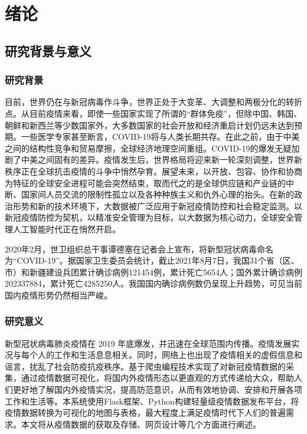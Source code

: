 \chapter{绪论}

\section{研究背景与意义}

\subsection{研究背景}

目前，世界仍在与新冠病毒作斗争，世界正处于大变革、大调整和两极分化的转折点。从目前疫情来看，即使一些国家实现了所谓的“群体免疫”，但除中国、韩国、朝鲜和新西兰等少数国家外，大多数国家的社会开放和经济重启计划仍远未达到预期。一些医学专家甚至断言，COVID-19将与人类长期共存。在此之前，由于中美之间的结构性竞争和贸易摩擦，全球经济地理空间重组。COVID-19的爆发无疑加剧了中美之间固有的差异。疫情发生后，世界格局将迎来新一轮深刻调整，世界新秩序正在全球抗击疫情的斗争中悄然孕育。展望未来，以开放、包容、协作和协商为特征的全球安全进程可能会突然结束，取而代之的是全球供应链和产业链的中断、国家间人员交流的限制性孤立以及各种种族主义和仇外心理的抬头。在新的政治形势和新的技术环境下，大数据被广泛应用于新冠疫情防控和社会稳定监测。以新冠疫情防控为契机，以精准安全管理为目标，以大数据为核心动力，全球安全管理人工智能时代正在悄然开启。

2020年2月，世卫组织总干事谭德塞在记者会上宣布，将新型冠状病毒命名为“COVID-19”。据国家卫生委员会统计，截止2021年8月7日，我国31个省（区、市）和新疆建设兵团累计确诊病例121454例，累计死亡5654人；国外累计确诊病例202337884，累计死亡4285250人。我国国内确诊病例数仍呈现上升趋势，可见当前国内疫情形势仍然相当严峻。


\subsection{研究意义}

新型冠状病毒肺炎疫情在 2019 年底爆发，并迅速在全球范围内传播。疫情发展实况与每个人的工作和生活息息相关。同时，网络上也出现了疫情相关的虚假信息和谣言，扰乱了社会防疫抗疫秩序。基于爬虫编程技术实现了对新冠疫情数据的采集，通过疫情数据可视化，将国内外疫情形态以更直观的方式传递给大众，帮助人们更好地了解国内外疫情实况，提高防范意识，从而有效地协调、安排和开展各项工作和生活等。本系统使用Flask框架、Python构建轻量级疫情数据发布平台，将疫情数据转换为可视化的地图与表格，最大程度上满足疫情时代下人们的普遍需求。本文将从疫情数据的获取及存储、网页设计等几个方面进行阐述。\citep{李宏2020基于民众视阈下的疫情数据可视化设计路径研究}

